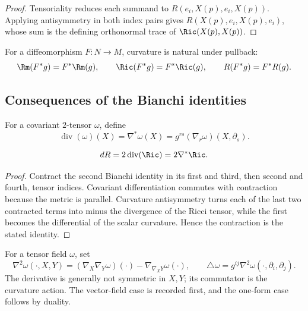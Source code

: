 \begin{proof}
\sketch
{}
\leanok
Tensoriality reduces each summand to
$R(e_i,X(p),e_i,X(p))$. Applying antisymmetry in both index pairs
gives $R(X(p),e_i,X(p),e_i)$, whose sum is the defining orthonormal
trace of $\Ric(X(p),X(p))$.
\end{proof}

For a diffeomorphism $F:N\to M$, curvature is natural under pullback:
\[
  \Rm(F^*g)=F^*\Rm(g),\qquad
  \Ric(F^*g)=F^*\Ric(g),\qquad
  R(F^*g)=F^*R(g).
\]

\subsection{Consequences of the Bianchi identities}

For a covariant $2$-tensor $\omega$, define
\[
  \operatorname{div}(\omega)(X)=\nabla^*\omega(X)
  =g^{rs}(\nabla_r\omega)(X,\partial_s).
\]

\begin{lemma}
\label{lem:div-ricci-scalar-curvature}
\leanok
\label{divRic}



$$dR=2\operatorname{div}(\Ric)=2\nabla^*\Ric.$$
\end{lemma}

\begin{proof}
\sketch
\leanok
{}
Contract the second Bianchi identity in its first and third, then second and fourth, tensor indices. Covariant differentiation commutes with contraction because the metric is parallel. Curvature antisymmetry turns each of the last two contracted terms into minus the divergence of the Ricci tensor, while the first becomes the differential of the scalar curvature. Hence the contraction is the stated identity.
\end{proof}


For a tensor field $\omega$, set
\[
  \nabla^2\omega(\cdot,X,Y)
  =(\nabla_X\nabla_Y\omega)(\cdot)-\nabla_{\nabla_XY}\omega(\cdot),
  \qquad
  \triangle\omega=g^{ij}\nabla^2\omega(\cdot,\partial_i,\partial_j).
\]
The derivative is generally not symmetric in $X,Y$; its commutator is
the curvature action. The vector-field case is recorded first, and the
one-form case follows by duality.

